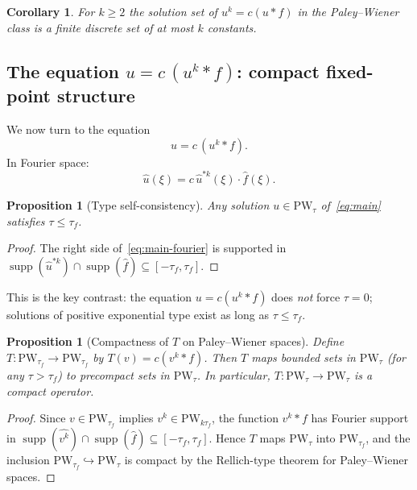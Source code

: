 \documentclass[12pt]{article}
\newtheorem{proposition}[theorem]{Proposition}
\newtheorem{corollary}[theorem]{Corollary}
\theoremstyle{definition}
\theoremstyle{remark}
\DeclareMathOperator{\supp}{supp}
\newcommand{\PW}{\mathrm{PW}}
\newcommand{\wh}{\widehat}
\begin{document}
\begin{corollary}
  For $k\geq 2$ the solution set of $u^k=c(u\ast f)$ in the Paley--Wiener
  class is a finite discrete set of at most $k$ constants.
\end{corollary}

\subsection{The equation $u=c\,(u^k\ast f)$: compact fixed-point structure}
\label{sec:reversed-eqn}

We now turn to the equation
\begin{equation}  \label{eq:main}
  u = c\,(u^k\ast f).
\end{equation}
In Fourier space:
\begin{equation}  \label{eq:main-fourier}
  \wh u(\xi) = c\,\wh u^{\ast k}(\xi)\cdot\wh f(\xi).
\end{equation}

\begin{proposition}[Type self-consistency]
  Any solution $u\in\PW_\tau$ of~\eqref{eq:main} satisfies $\tau\leq\tau_f$.
\end{proposition}

\begin{proof}
  The right side of~\eqref{eq:main-fourier} is supported in
  $\supp(\wh u^{\ast k})\cap\supp(\wh f)\subseteq[-\tau_f,\tau_f]$.
\end{proof}

This is the key contrast: the equation $u=c(u^k\ast f)$ does \emph{not}
force $\tau=0$; solutions of positive exponential type exist as long as
$\tau\leq\tau_f$.

\begin{proposition}[Compactness of $T$ on Paley--Wiener spaces]
  \label{prop:T-compact-PW}
  Define $T:\PW_{\tau_f}\to\PW_{\tau_f}$ by $T(v)=c(v^k\ast f)$.  Then
  $T$ maps bounded sets in $\PW_\tau$ (for any $\tau>\tau_f$) to precompact
  sets in $\PW_\tau$.  In particular, $T:\PW_\tau\to\PW_\tau$ is a compact
  operator.
\end{proposition}

\begin{proof}
  Since $v\in\PW_{\tau_f}$ implies $v^k\in\PW_{k\tau_f}$, the function
  $v^k\ast f$ has Fourier support in
  $\supp(\wh{v^k})\cap\supp(\wh f)\subseteq[-\tau_f,\tau_f]$.
  Hence $T$ maps $\PW_\tau$ into $\PW_{\tau_f}$, and the inclusion
  $\PW_{\tau_f}\hookrightarrow\PW_\tau$ is compact by the Rellich-type
  theorem for Paley--Wiener spaces.
\end{proof}
\end{document}
